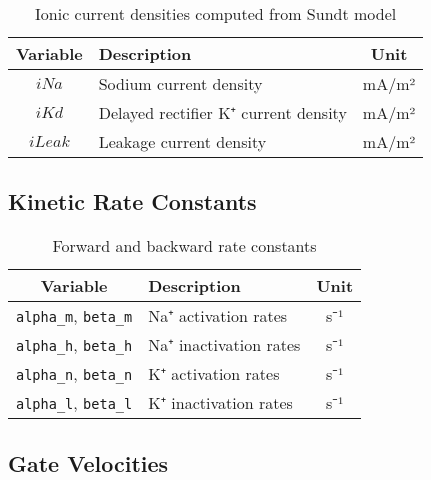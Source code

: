 \documentclass[11pt,a4paper]{article}
\begin{document}
\begin{table}[h!]
\centering
\begin{tabular}{clc}
\toprule
\textbf{Variable} & \textbf{Description} & \textbf{Unit} \\
\midrule
$iNa$ & Sodium current density & mA/m² \\
$iKd$ & Delayed rectifier K⁺ current density & mA/m² \\
$iLeak$ & Leakage current density & mA/m² \\
\bottomrule
\end{tabular}
\caption{Ionic current densities computed from Sundt model}
\end{table}

\subsection{Kinetic Rate Constants}

\begin{table}[h!]
\centering
\begin{tabular}{clc}
\toprule
\textbf{Variable} & \textbf{Description} & \textbf{Unit} \\
\midrule
\texttt{alpha\_m}, \texttt{beta\_m} & Na⁺ activation rates & s⁻¹ \\
\texttt{alpha\_h}, \texttt{beta\_h} & Na⁺ inactivation rates & s⁻¹ \\
\texttt{alpha\_n}, \texttt{beta\_n} & K⁺ activation rates & s⁻¹ \\
\texttt{alpha\_l}, \texttt{beta\_l} & K⁺ inactivation rates & s⁻¹ \\
\bottomrule
\end{tabular}
\caption{Forward and backward rate constants}
\end{table}

\subsection{Gate Velocities}
\end{document}
